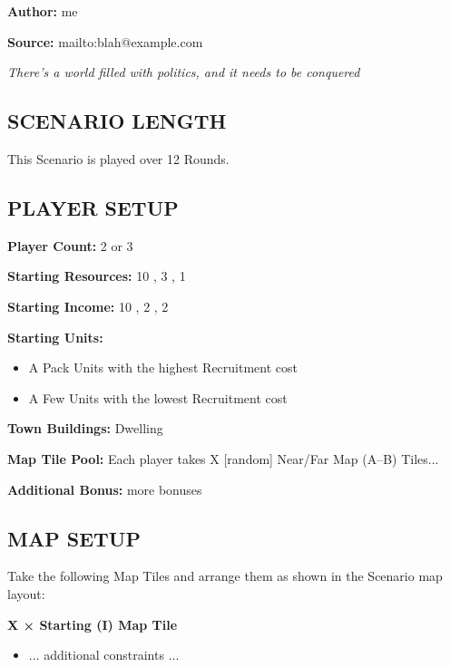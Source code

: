 
\begin{multicols*}{2}

\textbf{Author:} me

\textbf{Source:} mailto:blah@example.com

\textit{There's a world filled with politics, and it needs to be conquered}

\subsection*{\MakeUppercase{Scenario Length}}

This Scenario is played over 12 Rounds.

\subsection*{\MakeUppercase{Player Setup}}

\textbf{Player Count:} 2 or 3

\textbf{Starting Resources:} 10 , 3 , 1 

\textbf{Starting Income:} 10 , 2 , 2 

\textbf{Starting Units:}
\begin{itemize}
  \item A Pack  Units with the highest Recruitment cost
  \item A Few  Units with the lowest Recruitment cost
\end{itemize}

\textbf{Town Buildings:}  Dwelling

\textbf{Map Tile Pool:} Each player takes X [random] Near/Far Map (A--B) Tiles...

\textbf{Additional Bonus:} more bonuses

\subsection*{\MakeUppercase{Map Setup}}

Take the following Map Tiles and arrange them as shown in the Scenario map layout:

\textbf{X × Starting (I) Map Tile}
\begin{itemize}
    \item ... additional constraints ...
\end{itemize}


\end{multicols*}

